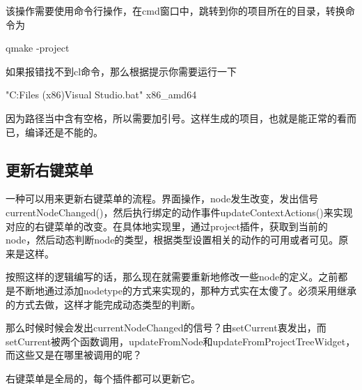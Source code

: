 该操作需要使用命令行操作，在cmd窗口中，跳转到你的项目所在的目录，转换命令为

qmake -project

如果报错找不到cl命令，那么根据提示你需要运行一下
\begin{listlsting}
"C:\Program Files (x86)\Microsoft Visual Studio\Community\VC\Auxiliary\Build\vcvarsall.bat" x86_amd64    
\end{listlsting}
因为路径当中含有空格，所以需要加引号。这样生成的项目，也就是能正常的看而已，编译还是不能的。

\subsection{更新右键菜单}
一种可以用来更新右键菜单的流程。界面操作，node发生改变，发出信号currentNodeChanged()，然后执行绑定的动作事件updateContextActions()来实现对应的右键菜单的改变。在具体地实现里，通过project插件，获取到当前的node，然后动态判断node的类型，根据类型设置相关的动作的可用或者可见。原来是这样。

按照这样的逻辑编写的话，那么现在就需要重新地修改一些node的定义。之前都是不断地通过添加nodetype的方式来实现的，那种方式实在太傻了。必须采用继承的方式去做，这样才能完成动态类型的判断。

那么时候时候会发出currentNodeChanged的信号？由setCurrent衷发出，而setCurrent被两个函数调用，updateFromNode和updateFromProjectTreeWidget，而这些又是在哪里被调用的呢？

右键菜单是全局的，每个插件都可以更新它。


